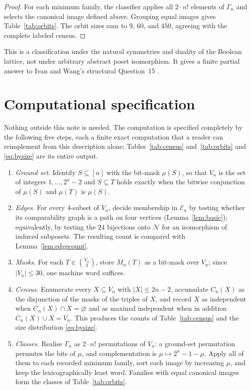 \documentclass[11pt]{amsart}
\newcommand{\Nposet}{\mathcal N}
\begin{document}
\begin{proof}
For each minimum family, the classifier applies all $2\cdot n!$ elements of
$\Gamma_n$ and selects the canonical image defined above. Grouping equal
images gives Table~\ref{tab:orbits}. The orbit sizes sum to $9$, $60$, and
$450$, agreeing with the complete labeled census.
\end{proof}

This is a classification under the natural symmetries and duality of the
Boolean lattice, not under arbitrary abstract poset isomorphism. It gives a
finite partial answer to Ivan and Wang's structural Question~15
\cite{IvanWang}.

\section*{Computational specification}

Nothing outside this note is needed. The computation is specified completely
by the following five steps, each a finite exact computation that a reader can
reimplement from this description alone; Tables~\ref{tab:census}
and~\ref{tab:orbits} and \eqref{eq:bysize} are its entire output.

\begin{enumerate}
\item \emph{Ground set.} Identify $S\subseteq[n]$ with the bit-mask $\mu(S)$,
so that $V_n$ is the set of integers $1,\dots,2^n-2$ and $S\subseteq T$ holds
exactly when the bitwise conjunction of $\mu(S)$ and $\mu(T)$ is $\mu(S)$.

\item \emph{Edges.} For every $4$-subset of $V_n$, decide membership in
$\mathcal E_n$ by testing whether its comparability graph is a path on four
vertices (Lemma~\ref{lem:basic}); equivalently, by testing the $24$ bijections
onto $\Nposet$ for an isomorphism of induced subposets. The resulting count is
compared with Lemma~\ref{lem:edgecount}.

\item \emph{Masks.} For each $T\in\binom{V_n}{3}$, store $M_n(T)$ as a bit-mask
over $V_n$; since $|V_n|\leq 30$, one machine word suffices.

\item \emph{Census.} Enumerate every $X\subseteq V_n$ with $|X|\leq 2n-2$,
accumulate $C_n(X)$ as the disjunction of the masks of the triples of $X$, and
record $X$ as independent when $C_n(X)\cap X=\varnothing$ and as maximal
independent when in addition $C_n(X)\cup X=V_n$. This produces the counts of
Table~\ref{tab:census} and the size distribution \eqref{eq:bysize}.

\item \emph{Classes.} Realise $\Gamma_n$ as $2\cdot n!$ permutations of $V_n$: a
ground-set permutation permutes the bits of $\mu$, and complementation is
$\mu\mapsto 2^n-1-\mu$. Apply all of them to each recorded minimum family, sort
each image by increasing $\mu$, and keep the lexicographically least word.
Families with equal canonical images form the classes of
Table~\ref{tab:orbits}.
\end{enumerate}
\end{document}

